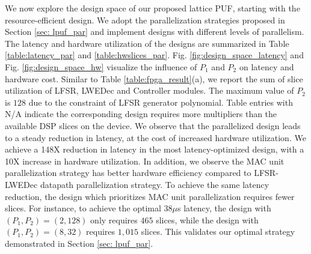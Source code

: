 We now explore the design space of our proposed lattice PUF, starting with the resource-efficient design. We adopt the parallelization strategies proposed in Section \ref{sec: lpuf_par} and implement designs with different levels of parallelism. The latency and hardware utilization of the designs are summarized in Table \ref{table:latency_par} and \ref{table:hwslices_par}. Fig. \ref{fig:design_space_latency} and Fig. \ref{fig:design_space_hw} visualize the influence of $P_1$ and $P_2$ on latency and hardware cost. Similar to Table %
\ref{table:fpga_result}(a), we report the sum of slice utilization of LFSR, LWEDec and Controller modules. The maximum value of $P_2$ is $128$ due to the constraint of LFSR generator polynomial. 
Table entries with N/A indicate the corresponding design requires more multipliers than the available DSP slices on the device. We observe that the parallelized design leads to a steady reduction in latency, at the cost of increased hardware utilization. We achieve a 148X reduction in latency in the most latency-optimized design, with a 10X increase in hardware utilization. %
In addition, we observe the MAC unit parallelization strategy has better hardware efficiency compared to LFSR-LWEDec datapath parallelization strategy. To achieve the same latency reduction, the design which prioritizes MAC unit parallelization requires fewer slices. For instance, to achieve the optimal $38 \mu$s latency, the design with $(P_1, P_2) = (2, 128)$ only requires $465$ slices, while the design with $(P_1, P_2) = (8, 32)$ requires $1,015$ slices. This validates our optimal strategy demonstrated in Section \ref{sec: lpuf_par}. %

